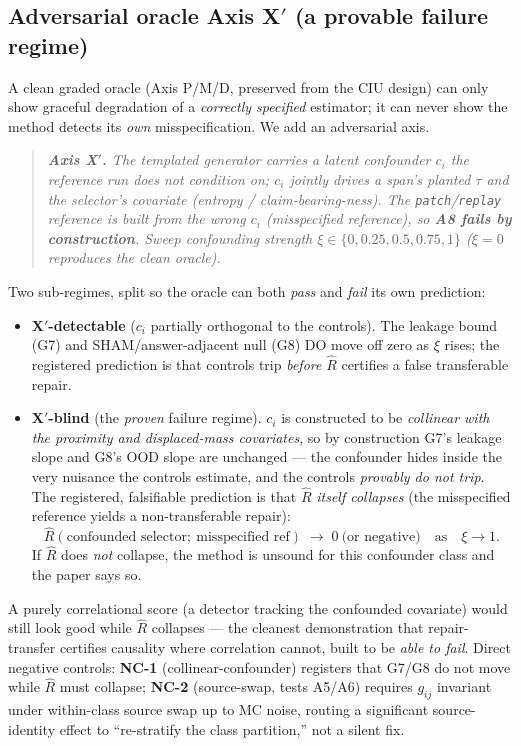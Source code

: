 \documentclass[11pt]{article}
\theoremstyle{plain}
\theoremstyle{definition}
\newcommand{\Rhat}{\widehat{R}}
\begin{document}
\subsection{Adversarial oracle Axis X$'$ (a provable failure regime)}\label{sec:method:oracle}

A clean graded oracle (Axis P/M/D, preserved from the CIU design) can only show
graceful degradation of a \emph{correctly specified} estimator; it can never show
the method detects its \emph{own} misspecification. We add an adversarial axis.
\begin{quote}\itshape
\textbf{Axis X$'$.} The templated generator carries a latent confounder $c_i$ the
reference run does \emph{not} condition on; $c_i$ jointly drives a span's planted
$\tau$ and the selector's covariate (entropy / claim-bearing-ness). The
\texttt{patch}/\texttt{replay} reference is built from the \emph{wrong} $c_i$
(misspecified reference), so \textbf{A8 fails by construction}. Sweep confounding
strength $\xi\in\{0,0.25,0.5,0.75,1\}$ ($\xi{=}0$ reproduces the clean oracle).
\end{quote}
Two sub-regimes, split so the oracle can both \emph{pass} and \emph{fail} its own
prediction:
\begin{itemize}[leftmargin=1.4em,itemsep=2pt]
  \item \textbf{X$'$-detectable} ($c_i$ partially orthogonal to the controls). The
  leakage bound (G7) and SHAM/answer-adjacent null (G8) DO move off zero as $\xi$
  rises; the registered prediction is that controls trip \emph{before} $\Rhat$
  certifies a false transferable repair.
  \item \textbf{X$'$-blind} (the \emph{proven} failure regime). $c_i$ is constructed
  to be \emph{collinear with the proximity and displaced-mass covariates}, so by
  construction G7's leakage slope and G8's OOD slope are unchanged --- the confounder
  hides inside the very nuisance the controls estimate, and the controls
  \emph{provably do not trip}. The registered, falsifiable prediction is that
  $\Rhat$ \emph{itself collapses} (the misspecified reference yields a
  non-transferable repair):
  \begin{equation}
  \Rhat(\text{confounded selector};\ \text{misspecified ref})\;\to\;0\ \text{(or negative)}\quad\text{as}\quad\xi\to1.
  \label{eq:p5}
  \end{equation}
  If $\Rhat$ does \emph{not} collapse, the method is unsound for this confounder
  class and the paper says so.
\end{itemize}
A purely correlational score (a detector tracking the confounded covariate) would
still look good while $\Rhat$ collapses --- the cleanest demonstration that
repair-transfer certifies causality where correlation cannot, built to be
\emph{able to fail}. Direct negative controls: \textbf{NC-1} (collinear-confounder)
registers that G7/G8 do not move while $\Rhat$ must collapse; \textbf{NC-2}
(source-swap, tests A5/A6) requires $g_{ij}$ invariant under within-class source
swap up to MC noise, routing a significant source-identity effect to ``re-stratify
the class partition,'' not a silent fix.
\end{document}
